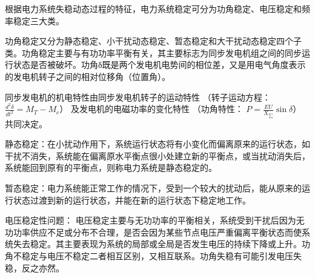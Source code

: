 \documentclass[UTF8, 12pt, a4paper]{ctexart}
\begin{document}
根据电力系统失稳动态过程的特征，电力系统稳定可分为功角稳定、电压稳定和频率稳定三大类。

功角稳定又分为静态稳定、小干扰动态稳定、暂态稳定和大干扰动态稳定四个子类。功角稳定主要与有功功率平衡有关，其主要标志为同步发电机组之间的同步运行状态是否被破坏。功角δ既是两个发电机电势间的相位差，又是用电气角度表示的发电机转子之间的相对位移角（位置角）。

同步发电机的机电特性由同步发电机转子的运动特性
（转子运动方程：
$\frac{d^{2} \delta }{dt^{2}}=M_T-M_e$）
及发电机的电磁功率的变化特性
（功角特性：
$P=\frac{EU}{X_{\sum{}}}\sin{\delta}$）
共同决定。

静态稳定：在小扰动作用下，系统运行状态将有小变化而偏离原来的运行状态，如干扰不消失，系统能在偏离原水平衡点很小处建立新的平衡点，或当扰动消失后，系统能回到原有的平衡点，则称电力系统是静态稳定的。

暂态稳定：电力系统能正常工作的情况下，受到一个较大的扰动后，能从原来的运行状态过渡到新的运行状态，并能在新的运行状态下稳定地工作。

电压稳定性问题：
电压稳定主要与无功功率的平衡相关，系统受到干扰后因为无功功率供应不足或分布不合理，是否会因为某些节点电压严重偏离平衡状态而使系统失去稳定。其主要表现为系统的局部或全局是否发生电压的持续下降或上升。功角不稳定与电压不稳定二者相互区别，又相互联系。功角失稳有可能引发电压失稳，反之亦然。
\end{document}
